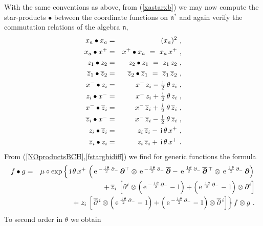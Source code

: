 \documentclass[11pt,a4paper]{article}
\newcommand{\mbf}[1]{{\boldsymbol {#1} }}
\def\ii{{\,{\rm i}\,}}
\def\mdell{{\mbf\partial}}
\def\mfn{{\mathfrak n}}
\def\e{{\,\rm e}\,}
\def\bea{\begin{eqnarray}}
\def\eea{\end{eqnarray}}
\newcommand{\z}{\zeta}
\begin{document}
With the same conventions as above, from (\ref{xastarxb}) we may now
compute the star-products $\bullet$ between the coordinate functions
on $\mfn^*$ and again verify the commutation relations of the
algebra $\mfn$,
\bea
x_a\bullet x_a&=&(x_a)^2 \ , \nonumber\\
x_a\bullet x^+&=&x^+\bullet x_a~=~x_a\,x^+ \ ,
\nonumber\\z_1\bullet z_2&=&z_2\bullet z_1
~=~z_1\,z_2 \ ,\nonumber\\\overline{z}_1\bullet \overline{z}_2
&=&\overline{z}_2\bullet \overline{z}_1
~=~\overline{z}_1\,\overline{z}_2 \ , \nonumber\\
x^-\bullet z_i&=&x^-\,z_i-\mbox{$\frac\ii2$}\,
\theta\,z_i \ , \nonumber\\
z_i\bullet x^-&=&x^-\,z_i+\mbox{$\frac\ii2$}\,
\theta\,z_i \ , \nonumber\\x^-\bullet \overline{z}_i
&=&x^-\,\overline{z}_i+\mbox{$\frac\ii2$}\,
\theta\,\overline{z}_i \ , \nonumber\\\overline{z}_i\bullet x^-
&=&x^-\,\overline{z}_i-\mbox{$\frac\ii2$}\,
\theta\,\overline{z}_i \ , \nonumber\\
z_i\bullet \overline{z}_i&=&z_i\,\overline{z}_i-\ii\theta\,x^+ \ ,
\nonumber\\ \overline{z}_i\bullet z_i &=&z_i\,\overline{z}_i+
\ii\theta\,x^+  \ .
\label{TOsymcoordstarprods}\eea
From (\ref{NOproductsBCH},\ref{fstargbidiff}) we find for generic
functions the formula
\bea
f\bullet g&=&\mu\circ\exp\left\{\ii\theta\,x^+\,\left(\e^{-\frac{\ii\theta}2
\,\partial_-}\,
\mdell^\top\otimes\e^{-\frac{\ii\theta}2\,\partial_-}\,
\overline{\mdell}-\e^{\frac{\ii\theta}2\,\partial_-}\,
\overline{\mdell}{}^{\,\top}\otimes\e^{\frac{\ii\theta}2\,\partial_-}\,
\mdell\right)\right.\nonumber
\\ &&\qquad\qquad+\,\overline{z}_i\,\left[\partial^i\otimes
\left(\e^{-\frac{\ii\theta}2\,\partial_-}-1\right)
+\left(\e^{\frac{\ii\theta}2\,\partial_-}-1\right)\otimes
\partial^i\right]\nonumber\\ &&\qquad\qquad+\left.
z_i\,\left[\,\overline{\partial}{}^{\,i}\otimes
\left(\e^{\frac{\ii\theta}2\,\partial_-}-1\right)
+\left(\e^{-\frac{\ii\theta}2\,\partial_-}-1\right)
\otimes\overline{\partial}{}^{\,i}\right]\right\}f\otimes g \ .
\label{TOsymstargen}\eea
To second order in $\theta$ we obtain
\end{document}
